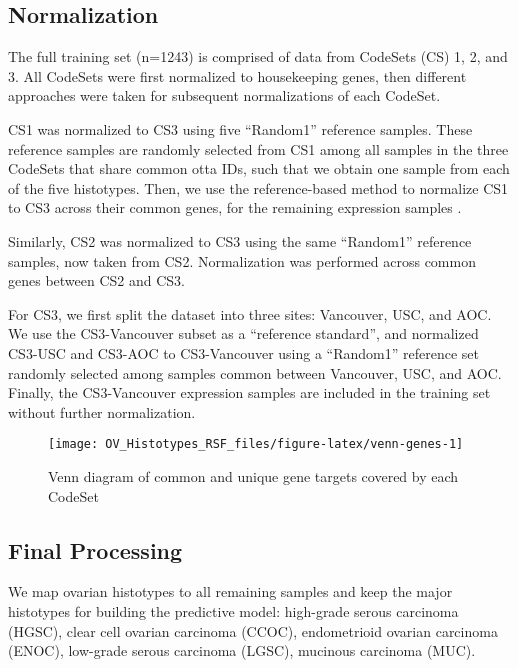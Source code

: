 \documentclass[
]{report}
\begin{document}
\subsection{Normalization}\label{normalization}

The full training set (n=1243) is comprised of data from CodeSets (CS) 1, 2, and 3. All CodeSets were first normalized to housekeeping genes, then different approaches were taken for subsequent normalizations of each CodeSet.

CS1 was normalized to CS3 using five ``Random1'' reference samples. These reference samples are randomly selected from CS1 among all samples in the three CodeSets that share common otta IDs, such that we obtain one sample from each of the five histotypes. Then, we use the reference-based method to normalize CS1 to CS3 across their common genes, for the remaining expression samples \citet{talhouk2016}.

Similarly, CS2 was normalized to CS3 using the same ``Random1'' reference samples, now taken from CS2. Normalization was performed across common genes between CS2 and CS3.

For CS3, we first split the dataset into three sites: Vancouver, USC, and AOC. We use the CS3-Vancouver subset as a ``reference standard'', and normalized CS3-USC and CS3-AOC to CS3-Vancouver using a ``Random1'' reference set randomly selected among samples common between Vancouver, USC, and AOC. Finally, the CS3-Vancouver expression samples are included in the training set without further normalization.

\begin{figure}[H]

{\centering \texttt{[image: OV\_Histotypes\_RSF\_files/figure-latex/venn-genes-1]} 

}

\caption{Venn diagram of common and unique gene targets covered by each CodeSet}\label{fig:venn-genes}
\end{figure}

\subsection{Final Processing}\label{final-processing}

We map ovarian histotypes to all remaining samples and keep the major histotypes for building the predictive model: high-grade serous carcinoma (HGSC), clear cell ovarian carcinoma (CCOC), endometrioid ovarian carcinoma (ENOC), low-grade serous carcinoma (LGSC), mucinous carcinoma (MUC).
\end{document}
